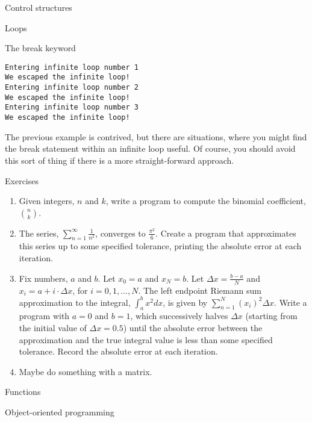 \documentclass[presentation]{beamer}
\begin{document}
\begin{frame}[fragile,label={sec:orgheadline4}]{Control structures}
\begin{block}{Loops}
\begin{block}{The break keyword}
\begin{verbatim}
Entering infinite loop number 1
We escaped the infinite loop!
Entering infinite loop number 2
We escaped the infinite loop!
Entering infinite loop number 3
We escaped the infinite loop!
\end{verbatim}

The previous example is contrived, but there are situations, where you
might find the break statement within an infinite loop useful. Of course,
you should avoid this sort of thing if there is a more straight-forward 
approach.
\end{block}
\end{block}


\begin{block}{Exercises}
\begin{enumerate}
\item Given integers, \(n\) and \(k\), write a program to compute the binomial coefficient, \(\displaystyle {n \choose k}\).
\item The series, \(\displaystyle \sum_{n=1}^{\infty} \frac{1}{n^2}\), converges to \(\displaystyle\frac{\pi^2}{6}\). Create a program that approximates this series up to some specified tolerance, printing the absolute error at each iteration.
\item Fix numbers, \(a\) and \(b\). Let \(x_0 = a\) and \(x_N=b\). Let \(\Delta x = \frac{b-a}{N}\) and \(x_i = a + i \cdot \Delta x\), for \(i = 0, 1, \ldots, N\). The left endpoint Riemann sum approximation to the integral, \(\displaystyle\int_a^b x^2 dx\), is given by \(\displaystyle\sum_{n=1}^N (x_i)^2 \Delta x\). Write a program with \(a=0\) and \(b=1\), which successively halves \(\Delta x\) (starting from the initial value of \(\Delta x = 0.5\)) until the absolute error between the approximation and the true integral value is less than some specified tolerance. Record the absolute error at each iteration.
\item Maybe do something with a matrix.
\end{enumerate}
\end{block}
\end{frame}

\begin{frame}[label={sec:orgheadline5}]{Functions}
\end{frame}
\begin{frame}[label={sec:orgheadline6}]{Object-oriented programming}
\end{frame}
\end{document}
